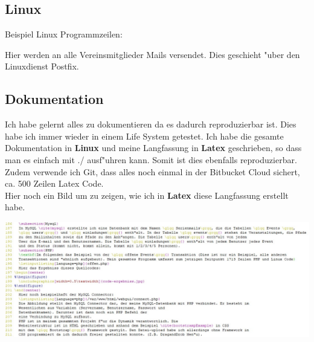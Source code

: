\documentclass[12pt,twoside]{article}  %
\begin{document}
  \subsection{Linux}
  Beispiel Linux Programmzeilen:  
  
  Hier werden an alle Vereinsmitglieder Mails versendet. Dies geschieht "uber den Linuxdienst Postfix.
  \subsection{Dokumentation}
  Ich habe gelernt alles zu dokumentieren da es dadurch reproduzierbar ist. Dies habe ich immer wieder in einem Life System getestet.
  Ich habe die gesamte Dokumentation in \textbf{Linux} und meine Langfassung in \textbf{Latex} geschrieben, so dass man es einfach mit \glqq./\grqq{} ausf"uhren 
  kann. Somit ist dies ebenfalls reproduzierbar. Zudem verwende ich Git, dass alles noch einmal 
  in der \glqq Bitbucket\grqq{} Cloud sichert, ca. 500 Zeilen Latex Code. \\
  Hier noch ein Bild um zu zeigen, wie ich in \textbf{Latex} diese Langfassung erstellt habe. 


  \includegraphics[width=1\textwidth]{beispiel_latex.jpg}
\end{document}
